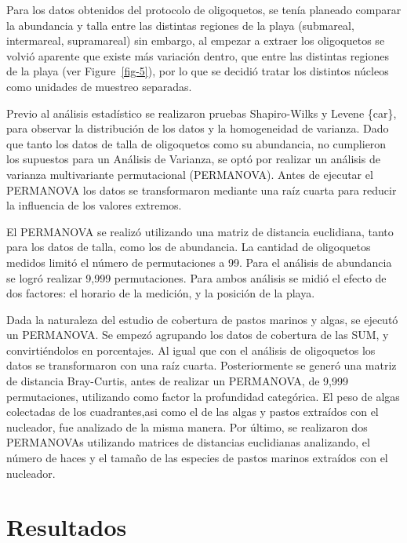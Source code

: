 \documentclass[
  authoryear,
  preprint,
  3p,
  twocolumn]{elsarticle}
\begin{document}
Para los datos obtenidos del protocolo de oligoquetos, se tenía planeado
comparar la abundancia y talla entre las distintas regiones de la playa
(submareal, intermareal, supramareal) sin embargo, al empezar a extraer
los oligoquetos se volvió aparente que existe más variación dentro, que
entre las distintas regiones de la playa (ver Figure~\ref{fig-5}), por
lo que se decidió tratar los distintos núcleos como unidades de muestreo
separadas.

Previo al análisis estadístico se realizaron pruebas Shapiro-Wilks y
Levene \{car\}, para observar la distribución de los datos y la
homogeneidad de varianza. Dado que tanto los datos de talla de
oligoquetos como su abundancia, no cumplieron los supuestos para un
Análisis de Varianza, se optó por realizar un análisis de varianza
multivariante permutacional (PERMANOVA). Antes de ejecutar el PERMANOVA
los datos se transformaron mediante una raíz cuarta para reducir la
influencia de los valores extremos.

El PERMANOVA se realizó utilizando una matriz de distancia euclidiana,
tanto para los datos de talla, como los de abundancia. La cantidad de
oligoquetos medidos limitó el número de permutaciones a 99. Para el
análisis de abundancia se logró realizar 9,999 permutaciones. Para ambos
análisis se midió el efecto de dos factores: el horario de la medición,
y la posición de la playa.

Dada la naturaleza del estudio de cobertura de pastos marinos y algas,
se ejecutó un PERMANOVA. Se empezó agrupando los datos de cobertura de
las SUM, y convirtiéndolos en porcentajes. Al igual que con el análisis
de oligoquetos los datos se transformaron con una raíz cuarta.
Posteriormente se generó una matriz de distancia Bray-Curtis, antes de
realizar un PERMANOVA, de 9,999 permutaciones, utilizando como factor la
profundidad categórica. El peso de algas colectadas de los
cuadrantes,asi como el de las algas y pastos extraídos con el nucleador,
fue analizado de la misma manera. Por último, se realizaron dos
PERMANOVAs utilizando matrices de distancias euclidianas analizando, el
número de haces y el tamaño de las especies de pastos marinos extraídos
con el nucleador.

\section{Resultados}\label{resultados}
\end{document}
